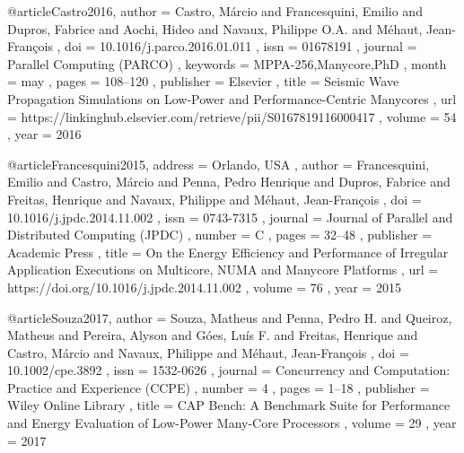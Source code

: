 @article{Castro2016,
	author    = { Castro, M{\'{a}}rcio and
		          Francesquini, Emilio and
			      Dupros, Fabrice and
				  Aochi, Hideo and
				  Navaux, Philippe O.A. and
				  M{\'{e}}haut, Jean-Fran{\c{c}}ois
	},
	doi       = { 10.1016/j.parco.2016.01.011 },
	issn      = { 01678191 },
	journal   = { Parallel Computing (PARCO) },
	keywords  = { MPPA-256,Manycore,PhD },
	month     = { may },
	pages     = { 108--120 },
	publisher = { Elsevier },
	title     = { Seismic Wave Propagation Simulations on Low-Power and Performance-Centric Manycores },
	url       = { https://linkinghub.elsevier.com/retrieve/pii/S0167819116000417 },
	volume    = { 54 },
	year      = { 2016 }
}

@article{Francesquini2015,
	address   = { Orlando, USA },
	author    = { Francesquini, Emilio
		          and Castro, M{\'{a}}rcio and
				  Penna, Pedro Henrique and
				  Dupros, Fabrice and
				  Freitas, Henrique and
				  Navaux, Philippe and
				  M{\'{e}}haut, Jean-Fran{\c{c}}ois
	},
	doi       = { 10.1016/j.jpdc.2014.11.002 },
	issn      = { 0743-7315 },
	journal   = { Journal of Parallel and Distributed Computing (JPDC) },
	number    = { C },
	pages     = { 32--48 },
	publisher = { Academic Press },
	title     = { On the Energy Efficiency and Performance of Irregular
	              Application Executions on Multicore, NUMA and Manycore Platforms
	},
	url       = { https://doi.org/10.1016/j.jpdc.2014.11.002 },
	volume    = { 76 },
	year      = { 2015 }
}

@article{Souza2017,
    author    = { Souza, Matheus and
                  Penna, Pedro H. and
                  Queiroz, Matheus and
                  Pereira, Alyson and
                  G{\'{o}}es, Lu{\'{i}}s F. and
                  Freitas, Henrique and
                  Castro, M{\'{a}}rcio and
                  Navaux, Philippe and
                  M{\'{e}}haut, Jean-Fran{\c{c}}ois
    },
    doi       = { 10.1002/cpe.3892 },
    issn      = { 1532-0626 },
    journal   = { Concurrency and Computation: Practice and Experience (CCPE) },
    number    = { 4 },
    pages     = { 1--18 },
    publisher = { Wiley Online Library },
    title     = { CAP Bench: A Benchmark Suite for Performance and
                  Energy Evaluation of Low-Power Many-Core Processors
    },
    volume    = { 29 },
    year      = { 2017 }
}
